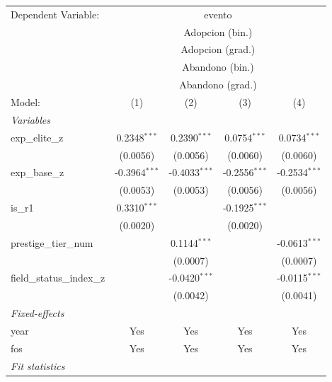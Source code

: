 
\begingroup
\centering
\begin{tabular}{lcccc}
   \tabularnewline \midrule \midrule
   Dependent Variable: & \multicolumn{4}{c}{evento}\\
    & \multicolumn{4}{c}{Adopcion (bin.)} \\ 
    & \multicolumn{4}{c}{Adopcion (grad.)} \\ 
    & \multicolumn{4}{c}{Abandono (bin.)} \\ 
    & \multicolumn{4}{c}{Abandono (grad.)} \\ 
   Model:                     & (1)             & (2)             & (3)             & (4)\\  
   \midrule
   \emph{Variables}\\
   exp\_elite\_z              & 0.2348$^{***}$  & 0.2390$^{***}$  & 0.0754$^{***}$  & 0.0734$^{***}$\\   
                              & (0.0056)        & (0.0056)        & (0.0060)        & (0.0060)\\   
   exp\_base\_z               & -0.3964$^{***}$ & -0.4033$^{***}$ & -0.2556$^{***}$ & -0.2534$^{***}$\\   
                              & (0.0053)        & (0.0053)        & (0.0056)        & (0.0056)\\   
   is\_r1                     & 0.3310$^{***}$  &                 & -0.1925$^{***}$ &   \\   
                              & (0.0020)        &                 & (0.0020)        &   \\   
   prestige\_tier\_num        &                 & 0.1144$^{***}$  &                 & -0.0613$^{***}$\\   
                              &                 & (0.0007)        &                 & (0.0007)\\   
   field\_status\_index\_z    &                 & -0.0420$^{***}$ &                 & -0.0115$^{***}$\\   
                              &                 & (0.0042)        &                 & (0.0041)\\   
   \midrule
   \emph{Fixed-effects}\\
   year                       & Yes             & Yes             & Yes             & Yes\\  
   fos                        & Yes             & Yes             & Yes             & Yes\\  
   \midrule
   \emph{Fit statistics}\\

\end{tabular}
